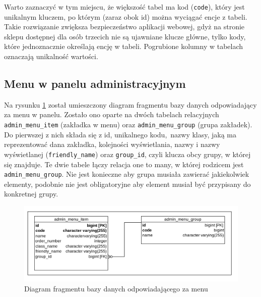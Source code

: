 Warto zaznaczyć w tym miejscu, że większość tabel ma kod (\texttt{code}), który jest unikalnym kluczem, po którym (zaraz obok id) można wyciągać encje z tabeli. Takie rozwiązanie zwiększa bezpieczeństwo aplikacji webowej, gdyż na stronie sklepu dostępnej dla osób trzecich nie są ujawniane klucze główne, tylko kody, które jednoznacznie określają encję w tabeli. Pogrubione kolumny w tabelach oznaczają unikalność wartości. 

\subsection{Menu w panelu administracyjnym}
Na rysunku \ref{db_menu} został umieszczony diagram fragmentu bazy danych odpowiadający za menu w panelu. Zostało ono oparte na dwóch tabelach relacyjnych \texttt{admin\_menu\_item} (zakładka w menu) oraz \texttt{admin\_menu\_group} (grupa zakładek). Do pierwszej z nich składa się z id, unikalnego kodu, nazwy klasy, jaką ma reprezentować dana zakładka, kolejności wyświetlania, nazwy i nazwy wyświetlanej (\texttt{friendly\_name}) oraz \texttt{group\_id}, czyli klucza obcy grupy, w której się znajduje. Te dwie tabele łączy relacja one to many, w której rodzicem jest \texttt{admin\_menu\_group}. Nie jest konieczne aby grupa musiała zawierać jakiekolwiek elementy, podobnie nie jest obligatoryjne aby element musiał być przypisany do konkretnej grupy. 

\begin{figure}
	\begin{center}
		\includegraphics[scale=0.3]{db_menu.png}
	\end{center}
	\caption{{\color{black}Diagram fragmentu bazy danych odpowiadającego za menu}} \label{db_menu}
\end{figure}

